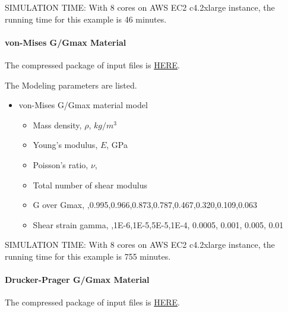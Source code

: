 SIMULATION TIME: With 8 cores on AWS EC2 c4.2xlarge instance, the running time for this example is 46 minutes.

\paragraph{von-Mises G/Gmax Material}
The compressed package of input files is  
\href{https://github.com/yuan-energy/Real-ESSI-Short-Course-Examples/tree/master/short-course-examples/nonlinear_analysis_steps/soil-structure/vonMisesGoverGmax/vonMisesGoverGmax.tgz?raw=true}{HERE}. 

The Modeling parameters are listed.
\begin{itemize}
  \item von-Mises G/Gmax material model 
  \begin{itemize}
    \item Mass density, $\rho$, \enspace {} $kg/m^3$
    \item Young's modulus, $E$, \enspace {} GPa
    \item Poisson's ratio, $\nu$, \enspace {}
    \item Total number of shear modulus \enspace {}
    \item G over Gmax, \enspace {},0.995,0.966,0.873,0.787,0.467,0.320,0.109,0.063
    \item Shear strain gamma, \enspace {},1E-6,1E-5,5E-5,1E-4, 0.0005, 0.001, 0.005, 0.01
  \end{itemize}
\end{itemize}

SIMULATION TIME: With 8 cores on AWS EC2 c4.2xlarge instance, the running time for this example is 755 minutes.

\paragraph{Drucker-Prager G/Gmax Material}
The compressed package of input files is  
\href{https://github.com/yuan-energy/Real-ESSI-Short-Course-Examples/tree/master/short-course-examples/nonlinear_analysis_steps/soil-structure/DruckerPragerGoverGmax/DruckerPragerGoverGmax.tgz?raw=true}{HERE}. 

